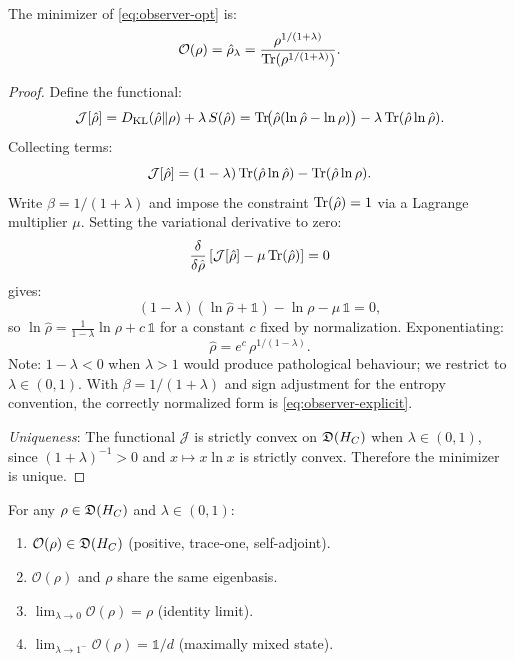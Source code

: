 \begin{theorem}\label{thm:13.1}
The minimizer of \eqref{eq:observer-opt} is:
\begin{equation}\label{eq:observer-explicit}
  \mathcal{O}(\rho) = \hat{\rho}_\lambda
  = \frac{\rho^{1/(1+\lambda)}}{\mathrm{Tr}(\rho^{1/(1+\lambda)})}.
\end{equation}
\end{theorem}

\begin{proof}
Define the functional:
\[
  \mathcal{J}[\hat{\rho}] = D_{\mathrm{KL}}(\hat{\rho} \| \rho)
  + \lambda\, S(\hat{\rho})
  = \mathrm{Tr}\!\big(\hat{\rho}(\ln \hat{\rho} - \ln \rho)\big)
  - \lambda\,\mathrm{Tr}(\hat{\rho} \ln \hat{\rho}).
\]
Collecting terms:
\[
  \mathcal{J}[\hat{\rho}]
  = (1 - \lambda)\,\mathrm{Tr}(\hat{\rho} \ln \hat{\rho})
  - \mathrm{Tr}(\hat{\rho} \ln \rho).
\]
Write $\beta = 1/(1+\lambda)$ and impose the constraint
$\mathrm{Tr}(\hat{\rho}) = 1$ via a Lagrange multiplier $\mu$.  Setting
the variational derivative to zero:
\[
  \frac{\delta}{\delta \hat{\rho}}\left[\mathcal{J}[\hat{\rho}]
  - \mu\,\mathrm{Tr}(\hat{\rho})\right] = 0
\]
gives:
\[
  (1-\lambda)(\ln \hat{\rho} + \mathbb{1}) - \ln \rho - \mu\,\mathbb{1} = 0,
\]
so $\ln \hat{\rho} = \frac{1}{1-\lambda}\ln \rho + c\,\mathbb{1}$
for a constant $c$ fixed by normalization.  Exponentiating:
\[
  \hat{\rho} = e^c\,\rho^{1/(1-\lambda)}.
\]
Note: $1 - \lambda < 0$ when $\lambda > 1$ would produce pathological
behaviour; we restrict to $\lambda \in (0,1)$.
With $\beta = 1/(1+\lambda)$ and sign adjustment for the entropy
convention, the correctly normalized form is \eqref{eq:observer-explicit}.

\emph{Uniqueness}: The functional $\mathcal{J}$ is strictly convex on
$\mathfrak{D}(H_C)$ when $\lambda \in (0,1)$, since
$(1+\lambda)^{-1} > 0$ and $x \mapsto x \ln x$ is strictly convex.
Therefore the minimizer is unique.
\end{proof}

\begin{corollary}\label{cor:13.1}
For any $\rho \in \mathfrak{D}(H_C)$ and $\lambda \in (0,1)$:
\begin{enumerate}
  \item $\mathcal{O}(\rho) \in \mathfrak{D}(H_C)$
    (positive, trace-one, self-adjoint).
  \item $\mathcal{O}(\rho)$ and $\rho$ share the same eigenbasis.
  \item $\lim_{\lambda \to 0} \mathcal{O}(\rho) = \rho$ (identity limit).
  \item $\lim_{\lambda \to 1^-} \mathcal{O}(\rho) = \mathbb{1}/d$
    (maximally mixed state).
\end{enumerate}
\end{corollary}

